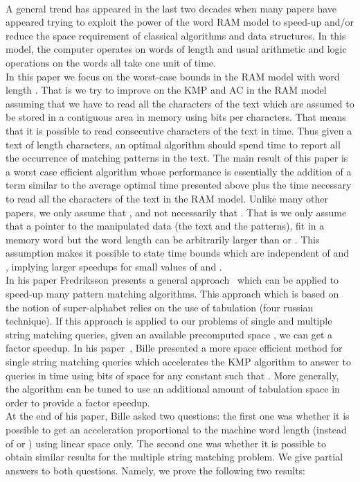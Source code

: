 \documentclass{article}
\newcommand{\?}{\mskip1.5mu}
\newcommand{\A}{\mathscr A}
\begin{document}
\\A general trend has appeared in the last two decades when many papers have appeared trying to exploit the power of the word RAM model to speed-up and/or reduce the space requirement of classical algorithms and data structures. In this model, the computer operates on words of length  and usual arithmetic and logic operations on the words all take one unit of time. 
\\
In this paper we focus on the worst-case bounds in the RAM model with word length . That is we try to improve on the KMP and AC in the RAM model assuming that we have to read all the characters of the text which are assumed to be stored in a contiguous area in memory using  bits per characters. That means that it is possible to read  consecutive characters of the text in  time. Thus given a text of length  characters, an optimal algorithm should spend  time to report all the occurrence of matching patterns in the text. The main result of this paper is a worst case efficient algorithm whose performance is essentially the addition of a term similar to the average optimal time presented above
plus the time necessary to read all the characters of the text in the RAM model. Unlike many other papers, we only assume that , and not necessarily that . That is we only assume that a pointer to the manipulated data (the text and the patterns), fit in a memory word but the word length  can be arbitrarily larger than  or . This assumption makes it possible to state time bounds which are independent of  and , implying larger speedups for small values of  and . 
\\
In his paper Fredriksson presents a general approach~\cite{F02} which can be applied to speed-up many pattern matching algorithms. This approach which is based on the notion of super-alphabet relies on the use of tabulation (four russian technique). If this approach is applied to our problems of single and multiple string matching queries, given an available precomputed space , we can get a  factor speedup. 
In his paper~\cite{B09}, Bille presented a more space efficient method for single string matching queries which accelerates the KMP algorithm to answer to queries in time  using  bits of space for any constant  such that . 
More generally, the algorithm can be tuned to use an additional amount  of tabulation space in order to provide a  factor speedup. 
\\At the end of his paper, Bille asked two questions: the first one was whether it is possible to get an acceleration proportional to the machine word length  (instead of  or ) using linear space only. The second one was whether it is possible to obtain similar results for the multiple string matching problem. We give partial answers to both questions. Namely, we prove the following two results:
\end{document}
